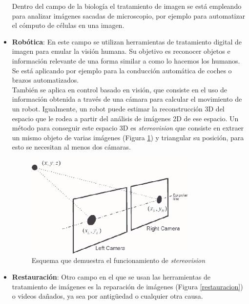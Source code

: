 \begin{itemize}
Dentro del campo de la biología el tratamiento de imagen se está empleando para analizar imágenes sacadas de microscopio, por ejemplo para automatizar el cómputo de células en una imagen.\\

\item \textbf{Robótica}: En este campo se utilizan herramientas de tratamiento digital de imagen para emular la visión humana. Su objetivo es reconocer objetos e información relevante de una forma similar a como lo hacemos los humanos. Se está aplicando por ejemplo para la conducción automática de coches o brazos automatizados.\\

También se aplica en control basado en visión, que consiste en el uso de información obtenida a través de una cámara para calcular el movimiento de un robot\cite{vision}. Igualmente, un robot puede estimar la reconstrucción 3D del espacio que le rodea a partir del análisis de imágenes 2D de ese espacio. Un método para conseguir este espacio 3D es \emph{stereovision} que consiste en extraer un mismo objeto de varias imágenes (Figura \ref{stereovision}) y triangular su posición, para esto se necesitan al menos dos cámaras\cite{stereovision}.

\begin{figure}[h]
\centering
\includegraphics[width=0.8\textwidth]{imagenes/stereovision.png}
\caption{Esquema que demuestra el funcionamiento de \emph{stereovision}}
\label{stereovision}
\end{figure}

\item \textbf{Restauración}: Otro campo en el que se usan las herramientas de tratamiento de imágenes es la reparación de imágenes (Figura \ref{restauracion}) o videos dañados, ya sea por antigüedad o cualquier otra causa. \\


\end{itemize}
